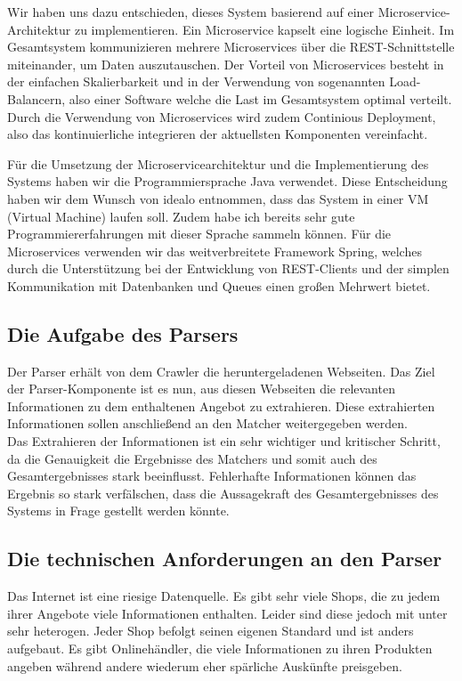 Wir haben uns dazu entschieden, dieses System basierend auf einer Microservice-Architektur zu implementieren. Ein Microservice kapselt eine logische Einheit. Im Gesamtsystem kommunizieren mehrere Microservices über die REST-Schnittstelle miteinander, um Daten auszutauschen. Der Vorteil von Microservices besteht in der einfachen Skalierbarkeit und in der Verwendung von sogenannten Load-Balancern, also einer Software welche die Last im Gesamtsystem optimal verteilt. Durch die Verwendung von Microservices wird zudem Continious Deployment, also das kontinuierliche integrieren der aktuellsten Komponenten vereinfacht.

Für die Umsetzung der Microservicearchitektur und die Implementierung des Systems haben wir die Programmiersprache Java verwendet. Diese Entscheidung haben wir dem Wunsch von idealo entnommen, dass das System in einer VM (Virtual Machine) laufen soll. Zudem habe ich bereits sehr gute Programmiererfahrungen mit dieser Sprache sammeln können. Für die Microservices verwenden wir das weitverbreitete Framework Spring, welches durch die Unterstützung bei der Entwicklung von REST-Clients und der simplen Kommunikation mit Datenbanken und Queues einen großen Mehrwert bietet.

\subsection{Die Aufgabe des Parsers}

Der Parser erhält von dem Crawler die heruntergeladenen Webseiten. Das Ziel der Parser-Komponente ist es nun, aus diesen Webseiten die relevanten Informationen zu dem enthaltenen Angebot zu extrahieren. Diese extrahierten Informationen sollen anschließend an den Matcher weitergegeben werden.\\
Das Extrahieren der Informationen ist ein sehr wichtiger und kritischer Schritt, da die Genauigkeit die Ergebnisse des Matchers und somit auch des Gesamtergebnisses stark beeinflusst. Fehlerhafte Informationen können das Ergebnis so stark verfälschen, dass die Aussagekraft des Gesamtergebnisses des Systems in Frage gestellt werden könnte.

\subsection{Die technischen Anforderungen an den Parser}

Das Internet ist eine riesige Datenquelle. Es gibt sehr viele Shops, die zu jedem ihrer Angebote viele Informationen enthalten. Leider sind diese jedoch mit unter sehr heterogen. Jeder Shop befolgt seinen eigenen Standard und ist anders aufgebaut. Es gibt Onlinehändler, die viele Informationen zu ihren Produkten angeben während andere wiederum eher spärliche Auskünfte preisgeben.

